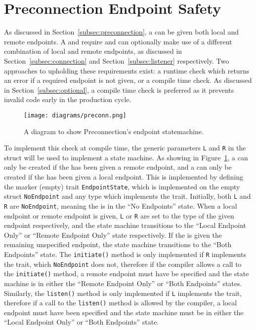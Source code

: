 \section{Preconnection Endpoint Safety}\label{sec:preconnection-endpoint-safety}
As discussed in Section~\ref{subsec:preconnection}, a \preconnection{} can be given both local and remote endpoints.
A \connection{} and \listener{} require and can optionally make use of a different combination of local
and remote endpoints, as discussed in Section~\ref{subsec:connection} and Section~\ref{subsec:listener} respectively.
Two approaches to upholding these requirements exist: a runtime check which returns an error if a required endpoint is
not given, or a compile time check.
As discussed in Section~\ref{subsec:optional}, a compile time check is preferred as it prevents invalid code early in
the production cycle.

\begin{figure}[h]
    \centering
    \texttt{[image: diagrams/preconn.png]}
    \caption{A diagram to show Preconnection's endpoint statemachine.}
    \label{fig:preconState}
\end{figure}

To implement this check at compile time, the generic parameters \texttt{L} and \texttt{R} in the \preconnection{} struct
will be used to implement a state machine.
As showing in Figure~\ref{fig:preconState}, a \connection{} can only be created if the \preconnection{} has been given
a remote endpoint, and a \listener{} can only be created if the \preconnection{} has been given a local endpoint.
This is implemented by defining the marker (empty) trait \texttt{EndpointState}, which is implemented on the empty
struct \texttt{NoEndpoint} and any type which implements the \Endpoint{} trait.
Initially, both \texttt{L} and \texttt{R} are \texttt{NoEndpoint}, meaning the \preconnection{} is in the “No Endpoints”
state.
When a local endpoint or remote endpoint is given, \texttt{L} or \texttt{R} are set to the type of the given endpoint
respectively, and the state machine transitions to the “Local Endpoint Only” or “Remote Endpoint Only” state
respectively.
If the \preconnection{} is given the remaining unspecified endpoint, the state machine transitions to the
“Both Endpoints” state.
The \texttt{initiate()} method is only implemented if \texttt{R} implements the \Endpoint{} trait, which
\texttt{NoEndpoint} does not, therefore if the compiler allows a call to the \texttt{initiate()} method, a remote
endpoint must have be specified and the state machine is in either the “Remote Endpoint Only” or “Both Endpoints”
states.
Similarly, the \texttt{listen()} method is only implemented if \texttt{L} implements the \Endpoint{} trait, therefore
if a call to the \texttt{listen()} method is allowed by the compiler, a local endpoint must have been specified and the
state machine must be in either the “Local Endpoint Only” or “Both Endpoints” state.

